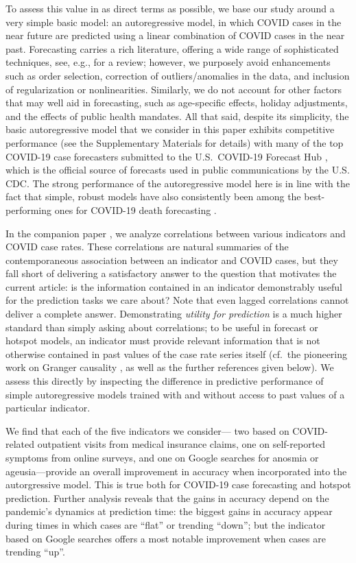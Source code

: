 \documentclass[9pt,twocolumn,twoside,lineno]{pnas-new}
\begin{document}
To assess this value in as direct terms as possible, we base our study around a
very simple basic model: an autoregressive model, in which COVID cases in the
near future are predicted using a linear combination of COVID cases in the near
past. Forecasting carries a rich literature, offering a wide range of
sophisticated techniques, see, e.g., \cite{Hyndman:2018} for a review; however,
we purposely avoid enhancements such as order selection, correction of
outliers/anomalies in the data, and inclusion of regularization or
nonlinearities. Similarly, we do not account for other factors that may well aid
in forecasting, such as age-specific effects, holiday adjustments, and the
effects of public health mandates. All that said, despite its simplicity, the
basic autoregressive model that we consider in this paper exhibits competitive
performance (see the Supplementary Materials for details) with many of the top
COVID-19 case forecasters submitted to the U.S.\ COVID-19 Forecast Hub
\cite{ForecastHub}, which is the official source of forecasts used in public
communications by the U.S. CDC. The strong performance of the autoregressive
model here is in line with the fact that simple, robust models have also
consistently been among the best-performing ones for COVID-19 death
forecasting \cite{Cramer:2021}. 

In the companion paper \cite{Reinhart:2021}, we analyze correlations between
various indicators and COVID case rates. These correlations are natural
summaries of the contemporaneous association between an indicator and COVID
cases, but they fall short of delivering a satisfactory answer to the question
that motivates the current article: is the information contained in an indicator
demonstrably useful for the prediction tasks we care about? Note that even
lagged correlations cannot deliver a complete answer. Demonstrating
\textit{utility for prediction} is a much higher standard than simply asking
about correlations; to be useful in forecast or hotspot models, an indicator
must provide relevant information that is not otherwise contained in past values
of the case rate series itself (cf.\ the pioneering work on Granger  causality
\cite{Granger:1969, engle1987a}, as well as the further references given 
below). We assess this directly by inspecting the difference in predictive  
performance of simple autoregressive models trained with and without access to  
past values of a particular indicator. 

We find that each of the five indicators we consider--- two based on
COVID-related outpatient visits from medical insurance claims, one on
self-reported symptoms from online surveys, and one on Google searches for
anosmia or ageusia---provide an overall improvement in accuracy when
incorporated into the autorgressive model. This is true both for COVID-19 case 
forecasting and hotspot prediction. Further analysis reveals that the gains in
accuracy depend on the pandemic's dynamics at prediction time: the biggest  
gains in accuracy appear during times in which cases are ``flat'' or trending
``down''; but the indicator based on Google searches offers a most notable
improvement when cases are trending ``up''.  
\end{document}
